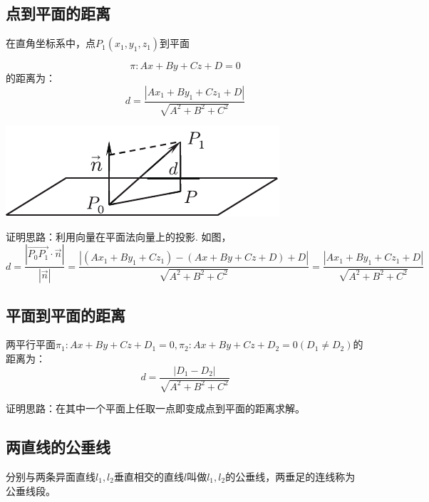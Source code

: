 \subsection{点到平面的距离}
\ttheorem[点到平面的距离]
\quad 在{\color{dy}直角坐标系}中，点$P_1(x_1,y_1,z_1)$到平面\\
\begin{minipage}{0.6\linewidth}
	$$\pi : Ax+By+Cz+D=0$$
	的距离为：
	\begin{equation}
	d=\frac{\left| Ax_1+By_1+Cz_1+D\right| }{\sqrt{A^2+B^2+C^2}}
	\end{equation}
\end{minipage}
\hfill
\begin{minipage}{0.4\linewidth}
	\centering
	\includegraphics[scale=1]{picture/C-2/2.5/point.pdf}
\end{minipage}
证明思路：利用向量在平面法向量上的投影. 如图，
$$d=\frac{\left| \overrightarrow{P_0P_1} \cdot \overrightarrow{n}\right| }{\left| \overrightarrow{n}\right| }=\frac{|(Ax_1+By_1+Cz_1)-(Ax+By+Cz+D)+D|}{\sqrt{A^2+B^2+C^2}}=\frac{\left| Ax_1+By_1+Cz_1+D\right| }{\sqrt{A^2+B^2+C^2}}$$



\subsection{平面到平面的距离}
\ttheorem[平面到平面的距离]
\quad 两平行平面$\pi _1:Ax+By+Cz+D_1=0,\pi _2:Ax+By+Cz+D_2=0(D_1 \neq D_2)$的距离为：
\begin{equation}
d=\frac{\left| D_1-D_2\right| }{\sqrt{A^2+B^2+C^2}}
\end{equation}

证明思路：在其中一个平面上任取一点即变成点到平面的距离求解。
\subsection{两直线的公垂线}
\tdefination[公垂线段]
分别与两条异面直线$l_1,l_2$垂直相交的直线$l$叫做$l_1,l_2$的公垂线，两垂足的连线称为公垂线段。


